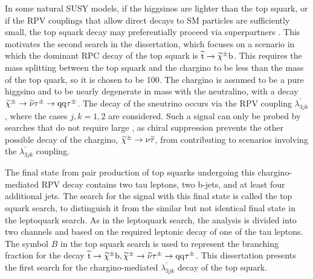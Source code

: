 In some natural SUSY models, if the higgsinos are lighter than the top squark, or if the RPV couplings that allow direct decays to SM particles are sufficiently small, the top squark decay may preferentially proceed via superpartners \cite{Jared}. This motivates the second search in the dissertation, which focuses on a scenario in which the dominant RPC decay of the top squark is $\widetilde{\mathrm{t}} \rightarrow \widetilde{\chi}^{\pm}\mathrm{b}$. This requires the mass splitting between the top squark and the chargino to be less than the mass of the top quark, so it is chosen to be 100\GeV. The chargino is assumed to be a pure higgsino and to be nearly degenerate in mass with the neutralino, with a decay $\widetilde{\chi}^{\pm} \rightarrow \widetilde{\nu}\tau^{\pm} \rightarrow \mathrm{q}\mathrm{q}\tau^{\pm}$. The decay of the sneutrino occurs via the RPV coupling $\lambda_{3jk}^{\prime}$, where the cases $j, k = 1, 2$ are considered. Such a signal can only be probed by searches that do not require large \met, as chiral suppression prevents the other possible decay of the chargino, $\widetilde{\chi}^{\pm}\to\nu\widetilde{\tau}$, from contributing to scenarios involving the $\lambda_{3jk}^{\prime}$ coupling.

The final state from pair production of top squarks undergoing this chargino-mediated RPV decay contains two tau leptons, two b-jets, and at least four additional jets. The search for the signal with this final state is called the top squark search, to distinguish it from the similar but not identical final state in the leptoquark search. As in the leptoquark search, the analysis is divided into two channels \etau and \mutau based on the required leptonic decay of one of the tau leptons. The symbol $B$ in the top squark search is used to represent the branching fraction for the decay $\widetilde{\mathrm{t}} \rightarrow \widetilde{\chi}^{\pm}\mathrm{b}, \widetilde{\chi}^{\pm} \rightarrow \widetilde{\nu}\tau^{\pm} \rightarrow \mathrm{q}\mathrm{q}\tau^{\pm}$.  This dissertation presents the first search for the chargino-mediated $\lambda_{3jk}^{\prime}$ decay of the top squark.